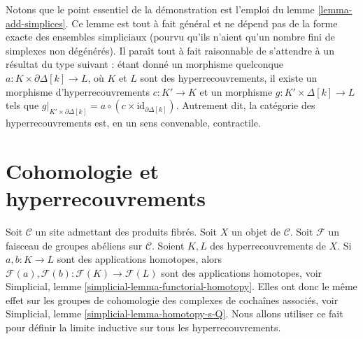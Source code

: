 \begin{remark}
\label{remark-contractible-category}
Notons que le point essentiel de la démonstration est l'emploi du
lemme \ref{lemma-add-simplices}. Ce lemme
est tout à fait général et ne dépend pas de la
forme exacte des ensembles simpliciaux (pourvu qu'ils
n'aient qu'un nombre fini de simplexes non dégénérés).
Il paraît tout à fait raisonnable de s'attendre à un résultat
du type suivant :
étant donné un morphisme quelconque $a : K \times \partial \Delta[k]
\to L$, où $K$ et $L$ sont des hyperrecouvrements, il
existe un morphisme d'hyperrecouvrements $c : K' \to K$
et un morphisme $g : K' \times \Delta[k] \to L$
tels que
$g|_{K' \times \partial \Delta[k]} =
a \circ (c \times \text{id}_{\partial \Delta[k]})$.
Autrement dit, la catégorie des hyperrecouvrements est, en un
sens convenable, contractile.
\end{remark}

















\section{Cohomologie et hyperrecouvrements}
\label{section-cohomology}

\noindent
Soit $\mathcal{C}$ un site admettant des produits fibrés.
Soit $X$ un objet de $\mathcal{C}$.
Soit $\mathcal{F}$ un faisceau de groupes abéliens sur $\mathcal{C}$.
Soient $K, L$ des hyperrecouvrements de $X$.
Si $a, b : K \to L$ sont des applications homotopes,
alors $\mathcal{F}(a), \mathcal{F}(b) : \mathcal{F}(K) \to \mathcal{F}(L)$
sont des applications homotopes, voir
Simplicial, lemme \ref{simplicial-lemma-functorial-homotopy}.
Elles ont donc le même effet sur les groupes de cohomologie des
complexes de cochaînes associés, voir
Simplicial, lemme \ref{simplicial-lemma-homotopy-s-Q}.
Nous allons utiliser ce fait pour définir la limite inductive sur tous les
hyperrecouvrements.

